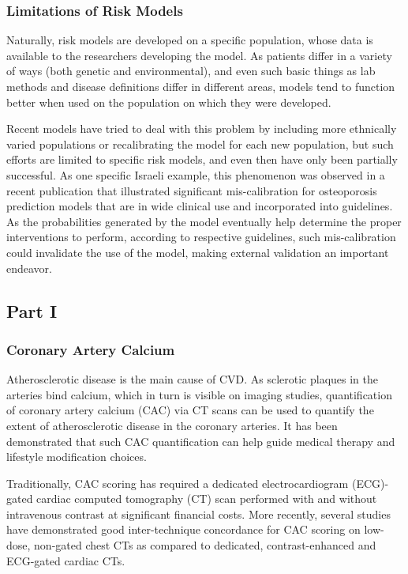\documentclass[a4paper,12pt]{article}
\begin{document}
			\subsubsection{Limitations of Risk Models}
			
			Naturally, risk models are developed on a specific population, whose data is available to the researchers developing the model. As patients differ in a variety of ways (both genetic and environmental), and even such basic things as lab methods and disease definitions differ in different areas, models tend to function better when used on the population on which they were developed\cite{DAgostino2001,Bastuji-Garin2002}.
			
			Recent models have tried to deal with this problem by including more ethnically varied populations\cite{DeFilippis2015} or recalibrating the model for each new population\cite{Kanis2008}, but such efforts are limited to specific risk models, and even then have only been partially successful\cite{Dagan2017}. As one specific Israeli example, this phenomenon was observed in a recent publication that illustrated significant mis-calibration for osteoporosis prediction models that are in wide clinical use and incorporated into guidelines\cite{Dagan2017}. As the probabilities generated by the model eventually help determine the proper interventions to perform, according to respective guidelines, such mis-calibration could invalidate the use of the model, making external validation an important endeavor\cite{Moons2012}.
			
		\subsection{Part I}
		
			\subsubsection{Coronary Artery Calcium}

			Atherosclerotic disease is the main cause of CVD. As sclerotic plaques in the arteries bind calcium, which in turn is visible on imaging studies, quantification of coronary artery calcium (CAC) via CT scans can be used to quantify the extent of atherosclerotic disease in the coronary arteries. It has been demonstrated that such CAC quantification can help guide medical therapy and lifestyle modification choices\cite{Takx2015,Elias-Smale2010,Erbel2010,Vliegenthart2005,Becker2005}.
			
			Traditionally, CAC scoring has required a dedicated electrocardiogram (ECG)-gated cardiac computed tomography (CT) scan performed with and without intravenous contrast at significant financial costs\cite{Halpern2010}. More recently, several studies have demonstrated good inter-technique concordance for CAC scoring on low-dose, non-gated chest CTs as compared to dedicated, contrast-enhanced and ECG-gated cardiac CTs\cite{Wu2008,Budoff2011}.
			
\end{document}
